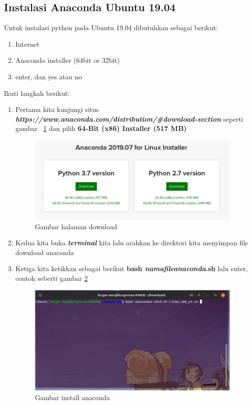 \subsection{Instalasi Anaconda Ubuntu 19.04}
Untuk instalasi python pada Ubuntu 19.04 dibutuhkan sebagai berikut:

\begin{enumerate}
\item Internet
\item Anaconda installer (64bit or 32bit)
\item enter, dan yes atau no
\end{enumerate}

Ikuti langkah berikut:
\begin{enumerate}
\item Pertama kita kunjungi situs \textbf{\textit{https://www.anaconda.com/distribution/\#download-section}} seperti gambar ~\ref{anacondadownload} dan pilih \textbf{64-Bit (x86) Installer (517 MB)}
\begin{figure}[H]
\centering
\includegraphics[width=1\textwidth]{figures/ubuntu/anacondadownload.png}
\caption{Gambar halaman download}
\label{anacondadownload}
\end{figure}

\item Kedua kita buka \textit{\textbf{terminal}} kita lalu arahkan ke direktori kita menyimpan file download anaconda

\item Ketiga kita ketikkan sebagai berikut \textbf{bash \textit{namafileanaconda}.sh} lalu enter, contoh seberti gambar \ref{anacondabash}
\begin{figure}[H]
\centering
\includegraphics[width=1\textwidth]{figures/ubuntu/anacondabash.png}
\caption{Gambar install anaconda}
\label{anacondabash}
\end{figure}


\end{enumerate}
